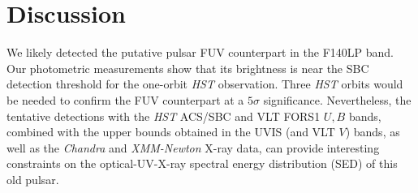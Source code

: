 \documentclass[pdftex,twocolumn]{aastex62}
\begin{document}
\section{Discussion \label{disc}}
We likely detected the putative pulsar FUV counterpart in 
the F140LP band. Our photometric measurements
show that its brightness  is near the SBC detection threshold 
for the one-orbit {\sl HST} 
observation.
Three {\sl HST} orbits would be 
needed to confirm the FUV counterpart at a 
$5\sigma$  significance. 
Nevertheless, the tentative detections with the {\sl HST} ACS/SBC and VLT FORS1 $U,B$ bands, combined 
with the 
upper bounds obtained in the UVIS 
(and VLT $V$) bands,   
as well as the {\sl Chandra} and {\sl XMM-Newton} X-ray  data,  can provide interesting constraints on the optical-UV-X-ray spectral energy distribution (SED) of this old  pulsar.      
\end{document}
